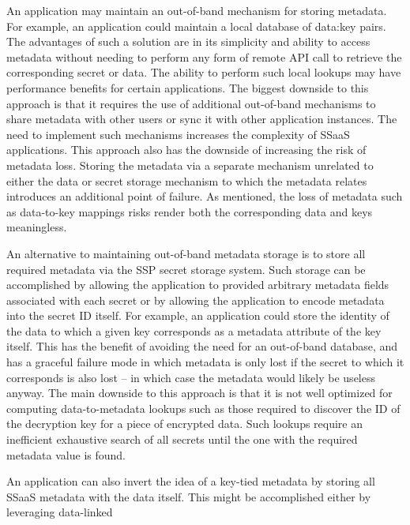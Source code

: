 \begin{packed_desc}
\item[Out-of-Band Metadata:] An application may maintain an
  out-of-band mechanism for storing metadata. For example, an
  application could maintain a local database of data:key pairs. The
  advantages of such a solution are in its simplicity and ability to
  access metadata without needing to perform any form of remote API
  call to retrieve the corresponding secret or data. The ability to
  perform such local lookups may have performance benefits for certain
  applications. The biggest downside to this approach is that it
  requires the use of additional out-of-band mechanisms to share
  metadata with other users or sync it with other application
  instances. The need to implement such mechanisms increases the
  complexity of SSaaS applications. This approach also has the
  downside of increasing the risk of metadata loss. Storing the
  metadata via a separate mechanism unrelated to either the data or
  secret storage mechanism to which the metadata relates introduces an
  additional point of failure. As mentioned, the loss of metadata such
  as data-to-key mappings risks render both the corresponding data and
  keys meaningless.
\item[Key-Tied Metadata:] An alternative to maintaining out-of-band
  metadata storage is to store all required metadata via the SSP
  secret storage system. Such storage can be accomplished by allowing
  the application to provided arbitrary metadata fields associated
  with each secret or by allowing the application to encode metadata
  into the secret ID itself. For example, an application could store
  the identity of the data to which a given key corresponds as a
  metadata attribute of the key itself. This has the benefit of
  avoiding the need for an out-of-band database, and has a graceful
  failure mode in which metadata is only lost if the secret to which
  it corresponds is also lost -- in which case the metadata would
  likely be useless anyway. The main downside to this approach is that
  it is not well optimized for computing data-to-metadata lookups such
  as those required to discover the ID of the decryption key for a
  piece of encrypted data. Such lookups require an inefficient
  exhaustive search of all secrets until the one with the required
  metadata value is found.
\item[Data-Tied Metadata:] An application can also invert the idea of
  a key-tied metadata by storing all SSaaS metadata with the data
  itself. This might be accomplished either by leveraging data-linked

\end{packed_desc}
